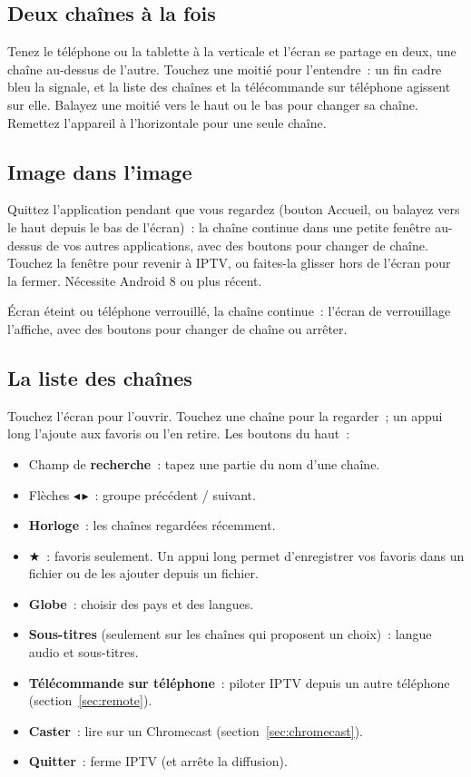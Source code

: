 \subsection{Deux chaînes à la fois}
Tenez le téléphone ou la tablette à la verticale et l'écran se partage en
deux, une chaîne au-dessus de l'autre. Touchez une moitié pour l'entendre~:
un fin cadre bleu la signale, et la liste des chaînes et la télécommande sur
téléphone agissent sur elle. Balayez une moitié vers le haut ou le bas pour
changer sa chaîne. Remettez l'appareil à l'horizontale pour une seule chaîne.

\subsection{Image dans l'image}
Quittez l'application pendant que vous regardez (bouton Accueil, ou balayez
vers le haut depuis le bas de l'écran)~: la chaîne continue dans une petite
fenêtre au-dessus de vos autres applications, avec des boutons pour changer
de chaîne. Touchez la fenêtre pour revenir à IPTV, ou faites-la glisser hors
de l'écran pour la fermer. Nécessite Android 8 ou plus récent.

Écran éteint ou téléphone verrouillé, la chaîne continue~: l'écran de
verrouillage l'affiche, avec des boutons pour changer de chaîne ou arrêter.

\subsection{La liste des chaînes}
Touchez l'écran pour l'ouvrir. Touchez une chaîne pour la regarder~; un appui
long l'ajoute aux favoris ou l'en retire. Les boutons du haut~:
\begin{itemize}
  \item Champ de \textbf{recherche}~: tapez une partie du nom d'une chaîne.
  \item Flèches $\blacktriangleleft$\,$\blacktriangleright$~: groupe précédent
        / suivant.
  \item \textbf{Horloge}~: les chaînes regardées récemment.
  \item $\bigstar$~: favoris seulement. Un appui long permet d'enregistrer
        vos favoris dans un fichier ou de les ajouter depuis un fichier.
  \item \textbf{Globe}~: choisir des pays et des langues.
  \item \textbf{Sous-titres} (seulement sur les chaînes qui proposent un
        choix)~: langue audio et sous-titres.
  \item \textbf{Télécommande sur téléphone}~: piloter IPTV depuis un autre
        téléphone (section~\ref{sec:remote}).
  \item \textbf{Caster}~: lire sur un Chromecast
        (section~\ref{sec:chromecast}).
  \item \textbf{Quitter}~: ferme IPTV (et arrête la diffusion).
\end{itemize}

